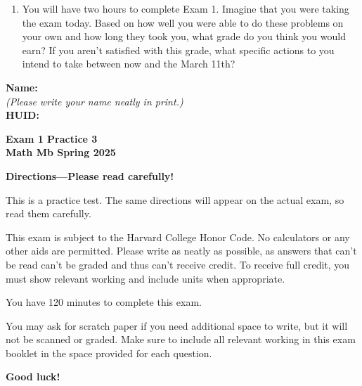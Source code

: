 \documentclass{article}
\begin{document}
{\begin{enumerate}
    \pspace{\vfill}
    
    \item You will have two hours to complete Exam 1. Imagine that you were taking the exam today. Based on how well you were able to do these problems on your own and how long they took you, what grade do you think you would earn? If you aren't satisfied with this grade, what specific actions to you intend to take between now and the March 11th?

    \pspace{\vfill}

\end{enumerate}

\newpage
}

\setcounter{page}{1}

{\large \mbox{} \hfill \bf Name:\underline{\hspace{3in}}}\\[2pt]
{\mbox{} \hfill \it (Please write your name neatly in print.)}\\[12pt]
{\large \mbox{} \hfill \bf HUID:\underline{\hspace{3in}}}
 
\medskip
 
\noindent
{\large\bf
Exam 1 Practice 3\\
Math Mb Spring 2025}
\noindent


{\Large
\begin{center}\textbf{Directions---Please read carefully!} \end{center}}

This is a practice test. The same directions will appear on the actual exam, so read them carefully.

\hrulefill 


This exam is subject to the Harvard College Honor Code. No calculators or any other aids are permitted.  Please write as neatly as possible, as answers that can't be read can't be graded and thus can't receive credit. To receive full credit, you must show relevant working
and include units when appropriate. 

You have 120 minutes to complete this exam. 

You may ask for scratch paper if you need additional space to write, but it will not be scanned or graded. Make sure to include all relevant working in this exam booklet in the space provided for each question.

\begin{center}\textbf{Good luck!}\end{center}
\end{document}
